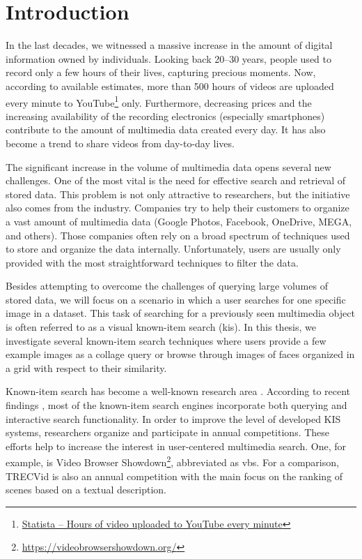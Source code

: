 \chapter*{Introduction}

In the last decades, we witnessed a massive increase in the amount of digital information owned by individuals. Looking back 20--30 years, people used to record only a few hours of their lives, capturing precious moments. Now, according to available estimates, more than 500 hours of videos are uploaded every minute to YouTube\footnote{\href{https://www.statista.com/statistics/259477/hours-of-video-uploaded-to-youtube-every-minute/}{Statista -- Hours of video uploaded to YouTube every minute}} only. Furthermore, decreasing prices and the increasing availability of the recording electronics (especially smartphones) contribute to the amount of multimedia data created every day. It has also become a trend to share videos from day-to-day lives.

The significant increase in the volume of multimedia data opens several new challenges. One of the most vital is the need for effective search and retrieval of stored data. This problem is not only attractive to researchers, but the initiative also comes from the industry. Companies try to help their customers to organize a vast amount of multimedia data (Google Photos, Facebook, OneDrive, MEGA, and others). Those companies often rely on a broad spectrum of techniques used to store and organize the data internally. Unfortunately, users are usually only provided with the most straightforward techniques to filter the data.

Besides attempting to overcome the challenges of querying large volumes of stored data, we will focus on a scenario in which a user searches for one specific image in a dataset. This task of searching for a previously seen multimedia object is often referred to as a visual known-item search (\acrshort{kis}). In this thesis, we investigate several known-item search techniques where users provide a few example images as a collage query or browse through images of faces organized in a grid with respect to their similarity.

Known-item search has become a well-known research area \citep{8352047}. According to recent findings \citep{9037125}, most of the known-item search engines incorporate both querying and interactive search functionality. In order to improve the level of developed KIS systems, researchers organize and participate in annual competitions. These efforts help to increase the interest in user-centered multimedia search. One, for example, is Video Browser Showdown\footnote{\url{https://videobrowsershowdown.org/}}, abbreviated as \acrshort{vbs}. For a comparison, TRECVid \citep{2019trecvidawad} is also an annual competition with the main focus on the ranking of scenes based on a textual description.

